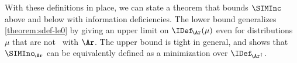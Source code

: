 With these definitions in place,
we can state a theorem that bounds $\SIMInc$ above and below with information deficiencies. 
The lower bound generalizes \cref{theorem:sdef-le0} by giving an upper limit on $\IDef_{\!\Ar}(\mu)$ even for distributions $\mu$ that are 
not \scible\ with $\Ar$.
The upper bound is tight in general, and shows that $\SIMInc_{\!\Ar}$ can be equivalently defined as a minimization over 
    $\IDef_{\!\Ar^\dagger}$.

